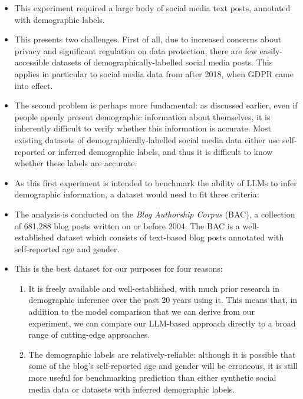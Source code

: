 \documentclass{report}
\begin{document}
\begin{itemize}

\item This experiment required a large body of social media text posts, annotated with demographic labels.

\item This presents two challenges. First of all, due to increased concerns about privacy and significant regulation on data protection, there are few easily-accessible datasets of demographically-labelled social media posts. This applies in particular to social media data from after 2018, when GDPR came into effect.

\item The second problem is perhaps more fundamental: as discussed earlier, even if people openly present demographic information about themselves, it is inherently difficult to verify whether this information is accurate. Most existing datasets of demographically-labelled social media data either use self-reported or inferred demographic labels, and thus it is difficult to know whether these labels are accurate.

\item As this first experiment is intended to benchmark the ability of LLMs to infer demographic information, a dataset would need to fit three criteria:

\item The analysis is conducted on the \textit{Blog Authorship Corpus} (BAC), a collection of 681,288 blog posts written on or before 2004\cite{blog-authorship-corpus}. The BAC is a well-established dataset which consists of text-based blog posts annotated with self-reported age and gender.

\item This is the best dataset for our purposes for four reasons:
\begin{enumerate}
\item It is freely available and well-established, with much prior research in demographic inference over the past 20 years using it. This means that, in addition to the model comparison that we can derive from our experiment, we can compare our LLM-based approach directly to a broad range of cutting-edge approaches.

\item The demographic labels are relatively-reliable: although it is possible that some of the blog's self-reported age and gender will be erroneous, it is still more useful for benchmarking prediction than either synthetic social media data or datasets with inferred demographic labels.


\end{enumerate}
\end{itemize}
\end{document}
